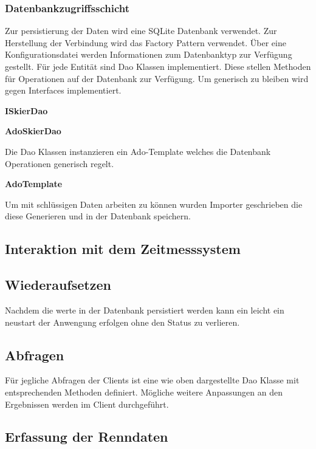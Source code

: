 \documentclass[a4paper, 12pt]{article}
\begin{document}
	\subsubsection{Datenbankzugriffsschicht}
	Zur persistierung der Daten wird eine SQLite Datenbank verwendet. Zur Herstellung der Verbindung wird das Factory Pattern verwendet. Über eine Konfigurationsdatei werden Informationen zum Datenbanktyp zur Verfügung gestellt. Für jede Entität sind Dao Klassen implementiert. Diese stellen Methoden für Operationen auf der Datenbank zur Verfügung. Um generisch zu bleiben wird gegen Interfaces implementiert.
	\newline
	 
	\textbf{ISkierDao}
	
	\textbf{AdoSkierDao}
	
	
	Die Dao Klassen instanzieren ein Ado-Template welches die Datenbank Operationen generisch regelt.
	
	\textbf{AdoTemplate}
	
	
	Um mit schlüssigen Daten arbeiten zu können wurden Importer geschrieben die diese Generieren und in der Datenbank speichern.
	
	\subsection{Interaktion mit dem Zeitmesssystem}
	
	\subsection{Wiederaufsetzen}
	Nachdem die werte in der Datenbank persistiert werden kann ein leicht ein neustart der Anwengung erfolgen ohne den Status zu verlieren.
	
	\subsection{Abfragen}
	Für jegliche Abfragen der Clients ist eine wie oben dargestellte Dao Klasse mit entsprechenden Methoden definiert. Mögliche weitere Anpassungen an den Ergebnissen werden im Client durchgeführt.
	
	\subsection{Erfassung der Renndaten}
\end{document}
